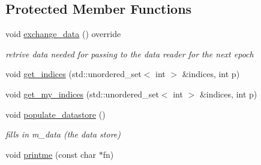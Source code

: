 \subsection*{Protected Member Functions}
\begin{DoxyCompactItemize}
\item 
void \hyperlink{classlbann_1_1data__store__csv_acacd039d3ca8caf8958b731a1ce382c6}{exchange\+\_\+data} () override
\begin{DoxyCompactList}\small\item\em retrive data needed for passing to the data reader for the next epoch \end{DoxyCompactList}\item 
void \hyperlink{classlbann_1_1data__store__csv_ae0deaa88a2f5164569f796f7d35510d8}{get\+\_\+indices} (std\+::unordered\+\_\+set$<$ int $>$ \&indices, int p)
\item 
void \hyperlink{classlbann_1_1data__store__csv_ab0ebfe735a732205f7f3c66c876e20b9}{get\+\_\+my\+\_\+indices} (std\+::unordered\+\_\+set$<$ int $>$ \&indices, int p)
\item 
void \hyperlink{classlbann_1_1data__store__csv_a6184c48ec096372899e127235bb741da}{populate\+\_\+datastore} ()
\begin{DoxyCompactList}\small\item\em fills in m\+\_\+data (the data store) \end{DoxyCompactList}\item 
void \hyperlink{classlbann_1_1data__store__csv_afe48c08075e3327a2b9bb14c73a9c952}{printme} (const char $\ast$fn)
\end{DoxyCompactItemize}
